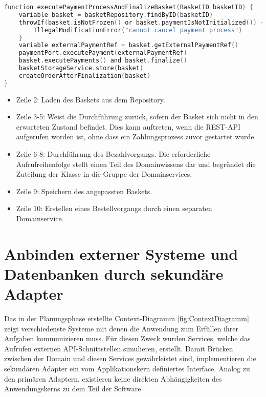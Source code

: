 \begin{minipage}{\linewidth} %
	\begin{lstlisting}[caption={Ausführung des Bezahlvorgangs in einem Domainservice}, label={lst:domainservice}, language=Kotlin]
function executePaymentProcessAndFinalizeBasket(BasketID basketID) {
	variable basket = basketRepository.findByID(basketID)
	throwIf(basket.isNotFrozen() or basket.paymentIsNotInitialized()) {
		IllegalModificationError("cannot cancel payment process")
	}
	variable externalPaymentRef = basket.getExternalPaymentRef()
	paymentPort.executePayment(externalPaymentRef)
	basket.executePayments() and basket.finalize()
	basketStorageService.store(basket)
	createOrderAfterFinalization(basket)
}
	\end{lstlisting}
	\begin{itemize}[noitemsep,nolistsep]
		\item Zeile 2: Laden des Baskets aus dem Repository.
		\item Zeile 3-5: Weist die Durchführung zurück, sofern der Basket sich nicht in den erwarteten Zustand befindet. Dies kann auftreten, wenn die REST-API aufgerufen worden ist, ohne dass ein Zahlungsprozess zuvor gestartet wurde.
		\item Zeile 6-8: Durchführung des Bezahlvorgangs. Die erforderliche Aufrufreihenfolge stellt einen Teil des Domainwissens dar und begründet die Zuteilung der Klasse in die Gruppe der Domainservices.
		\item Zeile 9: Speichern des angepassten Baskets.
		\item Zeile 10: Erstellen eines Bestellvorgangs durch einen separaten Domainservice.
	\end{itemize}
\end{minipage}

\section{Anbinden externer Systeme und Datenbanken durch sekundäre Adapter}

Das in der Planungsphase erstellte Context-Diagramm \ref{fig:ContextDiagramm} zeigt verschiedenste Systeme mit denen die Anwendung zum Erfüllen ihrer Aufgaben kommunizieren muss. Für diesen Zweck wurden Services, welche das Aufrufen externen API-Schnittstellen simulieren, erstellt. Damit Brücken zwischen der Domain und diesen Services gewährleistet sind, implementieren die sekundären Adapter ein vom Applikationskern definiertes Interface. Analog zu den primären Adaptern, existieren keine direkten Abhängigkeiten des Anwendungskerns zu dem Teil der Software.

